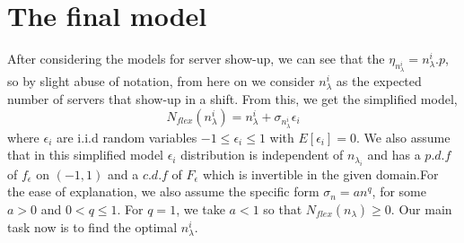 \section{The final model}
After considering the models for server show-up, we can see that the $\eta_{n_\lambda^{i}}=n_\lambda^{i}.p$, so by slight abuse of notation, from here on we consider $n_\lambda^{i}$ as the expected number of servers that show-up in a shift. From this, we get the simplified model,$$N_{flex}(n_\lambda^{i})=n_\lambda^{i}+\sigma_{n_\lambda^{i}}\epsilon_i$$ where $\epsilon_i$ are i.i.d random variables $ -1 \leq \epsilon_i \leq 1$ with $E[\epsilon_i]=0$. We also assume that in this simplified model $\epsilon_i$ distribution is independent of $n_\lambda_{i}$ and has a $p.d.f$ of $f_\epsilon$ on $(-1,1)$ and a $c.d.f$ of $F_\epsilon$ which is invertible in the given domain.For the ease of explanation, we also assume the specific form $\sigma_n = an^q$, for some $a > 0$ and $0<q\leq1$. For $q = 1$, we take $a < 1$ so that $N_{flex}(n_\lambda) \geq 0$. Our main task now is to find the optimal $n_{\lambda}^{i}$.
